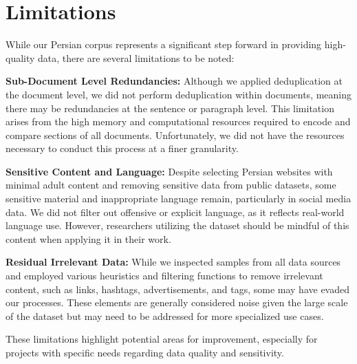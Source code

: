 \section{Limitations}
While our Persian corpus represents a significant step forward in providing high-quality data, there are several limitations to be noted:

\textbf{Sub-Document Level Redundancies:} Although we applied deduplication at the document level, we did not perform deduplication within documents, meaning there may be redundancies at the sentence or paragraph level. This limitation arises from the high memory and computational resources required to encode and compare sections of all documents. Unfortunately, we did not have the resources necessary to conduct this process at a finer granularity.

\textbf{Sensitive Content and Language:} Despite selecting Persian websites with minimal adult content and removing sensitive data from public datasets, some sensitive material and inappropriate language remain, particularly in social media data. We did not filter out offensive or explicit language, as it reflects real-world language use. However, researchers utilizing the dataset should be mindful of this content when applying it in their work.

\textbf{Residual Irrelevant Data:} While we inspected samples from all data sources and employed various heuristics and filtering functions to remove irrelevant content, such as links, hashtags, advertisements, and tags, some may have evaded our processes. These elements are generally considered noise given the large scale of the dataset but may need to be addressed for more specialized use cases.

These limitations highlight potential areas for improvement, especially for projects with specific needs regarding data quality and sensitivity.